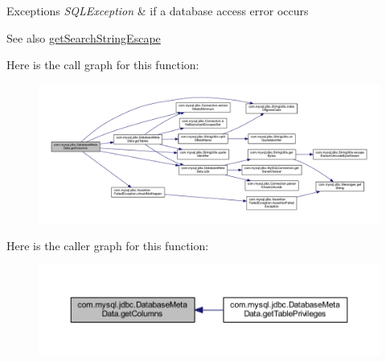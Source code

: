 \begin{DoxyExceptions}{Exceptions}
{\em S\+Q\+L\+Exception} & if a database access error occurs \\
\hline
\end{DoxyExceptions}
\begin{DoxySeeAlso}{See also}
\mbox{\hyperlink{classcom_1_1mysql_1_1jdbc_1_1_database_meta_data_a210b7942557a965c3af550074bb6fe9d}{get\+Search\+String\+Escape}} 
\end{DoxySeeAlso}
Here is the call graph for this function\+:\nopagebreak
\begin{figure}[H]
\begin{center}
\leavevmode
\includegraphics[width=350pt]{classcom_1_1mysql_1_1jdbc_1_1_database_meta_data_aa499f30e9c9222a702a504ad205d1802_cgraph}
\end{center}
\end{figure}
Here is the caller graph for this function\+:\nopagebreak
\begin{figure}[H]
\begin{center}
\leavevmode
\includegraphics[width=350pt]{classcom_1_1mysql_1_1jdbc_1_1_database_meta_data_aa499f30e9c9222a702a504ad205d1802_icgraph}
\end{center}
\end{figure}
\mbox{\label{classcom_1_1mysql_1_1jdbc_1_1_database_meta_data_a8db5167e582f242a48275aaffc5aa04a}} 
